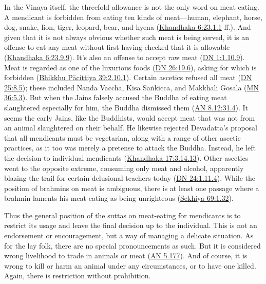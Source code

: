 \documentclass[12pt,openany]{book}%
\begin{document}
In the Vinaya itself, the threefold allowance is not the only word on meat eating. A mendicant is forbidden from eating ten kinds of meat—human, elephant, horse, dog, snake, lion, tiger, leopard, bear, and hyena (\href{https://suttacentral.net/pli-tv-kd6/en/brahmali\#23.1.1}{Khandhaka 6:23.1.1} ff.). And given that it is not always obvious whether such meat is being served, it is an offense to eat any meat without first having checked that it is allowable (\href{https://suttacentral.net/pli-tv-kd6/en/brahmali\#23.9.9}{Khandhaka 6:23.9.9}). It’s also an offense to accept raw meat (\href{https://suttacentral.net/dn1/en/sujato\#1.10.9}{DN 1:1.10.9}). Meat is regarded as one of the luxurious foods (\href{https://suttacentral.net/dn26/en/sujato\#19.6}{DN 26:19.6}), asking for which is forbidden (\href{https://suttacentral.net/pli-tv-bu-vb-pc39/en/brahmali\#2.10.1}{Bhikkhu Pācittiya 39:2.10.1}). Certain ascetics refused all meat (\href{https://suttacentral.net/dn25/en/sujato\#8.5}{DN 25:8.5}); these included Nanda Vaccha, Kisa \textsanskrit{Saṅkicca}, and Makkhali \textsanskrit{Gosāla} (\href{https://suttacentral.net/mn36/en/sujato\#5.3}{MN 36:5.3}). But when the Jains falsely accused the Buddha of eating meat slaughtered especially for him, the Buddha dismissed them (\href{https://suttacentral.net/an8.12/en/sujato\#31.4}{AN 8.12:31.4}). It seems the early Jains, like the Buddhists, would accept meat that was not from an animal slaughtered on their behalf. He likewise rejected Devadatta’s proposal that all mendicants must be vegetarian, along with a range of other ascetic practices, as it too was merely a pretense to attack the Buddha. Instead, he left the decision to individual mendicants (\href{https://suttacentral.net/pli-tv-kd17/en/brahmali\#3.14.13}{Khandhaka 17:3.14.13}). Other ascetics went to the opposite extreme, consuming only meat and alcohol, apparently blazing the trail for certain delusional teachers today (\href{https://suttacentral.net/dn24/en/sujato\#1.11.4}{DN 24:1.11.4}). While the position of brahmins on meat is ambiguous, there is at least one passage where a brahmin laments his meat-eating as being unrighteous (\href{https://suttacentral.net/pli-tv-bu-vb-sk69/en/brahmali\#1.32}{Sekhiya 69:1.32}).

Thus the general position of the suttas on meat-eating for mendicants is to restrict its usage and leave the final decision up to the individual. This is not an endorsement or encouragement, but a way of managing a delicate situation. As for the lay folk, there are no special pronouncements as such. But it is considered wrong livelihood to trade in animals or meat (\href{https://suttacentral.net/an5.177/en/sujato}{AN 5.177}). And of course, it is wrong to kill or harm an animal under any circumstances, or to have one killed. Again, there is restriction without prohibition.
\end{document}

